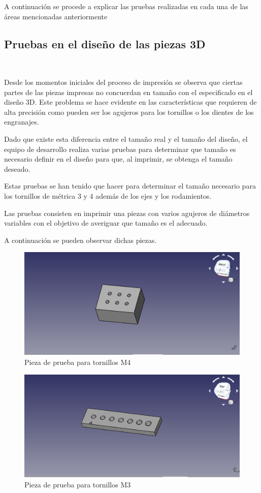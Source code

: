 A continuación se procede a explicar las pruebas realizadas en cada una de las áreas mencionadas anteriormente

\subsection{Pruebas en el diseño de las piezas 3D}
\

Desde los momentos iniciales del proceso de impresión se observa que ciertas partes de las piezas impresas no concuerdan en tamaño con el especificado en el diseño 3D. Este problema se hace evidente en las características que requieren de alta precisión como pueden ser los agujeros para los tornillos o los dientes de los engranajes.

Dado que existe esta diferencia entre el tamaño real y el tamaño del diseño, el equipo de desarrollo realiza varias pruebas para determinar que tamaño es necesario definir en el diseño para que, al imprimir, se obtenga el tamaño deseado.

Estas pruebas se han tenido que hacer para determinar el tamaño necesario para los tornillos de métrica 3 y 4 además de los ejes y los rodamientos.

Las pruebas consisten en imprimir una piezas con varios agujeros de diámetros variables con el objetivo de averiguar que tamaño es el adecuado.

A continuación se pueden observar dichas piezas.

\begin{figure}[H]
    \centering
    \includegraphics[width=.7\linewidth]{pictures/LadrilloPrueba.png}
    \caption{Pieza de prueba para tornillos M4}
    \label{fig:prueba_m4}
\end{figure}

\begin{figure}[H]
    \centering
    \includegraphics[width=.7\linewidth]{pictures/PruebaM3.png}
    \caption{Pieza de prueba para tornillos M3}
    \label{fig:prueba_m3}
\end{figure}


